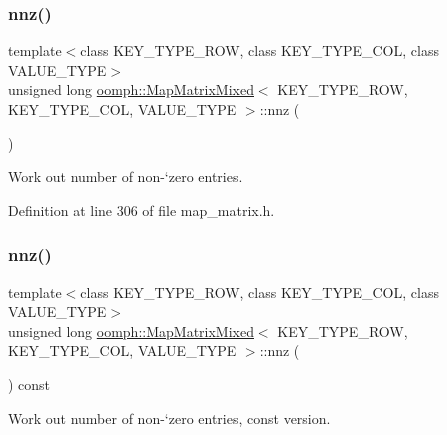 \subsubsection{\texorpdfstring{nnz()}{nnz()}\hspace{0.1cm}{\footnotesize\ttfamily [1/2]}}
{\footnotesize\ttfamily template$<$class K\+E\+Y\+\_\+\+T\+Y\+P\+E\+\_\+\+R\+OW, class K\+E\+Y\+\_\+\+T\+Y\+P\+E\+\_\+\+C\+OL, class V\+A\+L\+U\+E\+\_\+\+T\+Y\+PE$>$ \\
unsigned long \hyperlink{classoomph_1_1MapMatrixMixed}{oomph\+::\+Map\+Matrix\+Mixed}$<$ K\+E\+Y\+\_\+\+T\+Y\+P\+E\+\_\+\+R\+OW, K\+E\+Y\+\_\+\+T\+Y\+P\+E\+\_\+\+C\+OL, V\+A\+L\+U\+E\+\_\+\+T\+Y\+PE $>$\+::nnz (\begin{DoxyParamCaption}{ }\end{DoxyParamCaption})\hspace{0.3cm}{\ttfamily [inline]}}



Work out number of non-\/`zero\textquotesingle{} entries. 



Definition at line 306 of file map\+\_\+matrix.\+h.

\mbox{\label{classoomph_1_1MapMatrixMixed_a578320f7979e3f69578e8fb8a42c3ee6}} 
\subsubsection{\texorpdfstring{nnz()}{nnz()}\hspace{0.1cm}{\footnotesize\ttfamily [2/2]}}
{\footnotesize\ttfamily template$<$class K\+E\+Y\+\_\+\+T\+Y\+P\+E\+\_\+\+R\+OW, class K\+E\+Y\+\_\+\+T\+Y\+P\+E\+\_\+\+C\+OL, class V\+A\+L\+U\+E\+\_\+\+T\+Y\+PE$>$ \\
unsigned long \hyperlink{classoomph_1_1MapMatrixMixed}{oomph\+::\+Map\+Matrix\+Mixed}$<$ K\+E\+Y\+\_\+\+T\+Y\+P\+E\+\_\+\+R\+OW, K\+E\+Y\+\_\+\+T\+Y\+P\+E\+\_\+\+C\+OL, V\+A\+L\+U\+E\+\_\+\+T\+Y\+PE $>$\+::nnz (\begin{DoxyParamCaption}{ }\end{DoxyParamCaption}) const\hspace{0.3cm}{\ttfamily [inline]}}



Work out number of non-\/`zero\textquotesingle{} entries, const version. 



